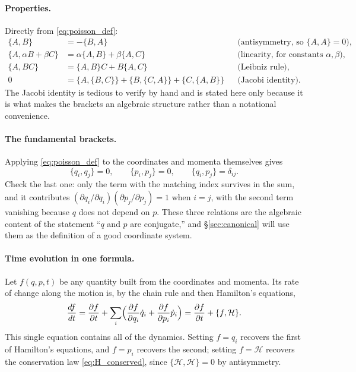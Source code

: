 \documentclass[12pt]{article}
\newcommand{\Ham}{\mathcal{H}}
\newcommand{\pb}[2]{\{#1,#2\}}
\begin{document}
\paragraph{Properties.}  Directly from \eqref{eq:poisson_def}:
%
\begin{align}
  \pb{A}{B} &= -\pb{B}{A}
    &&\text{(antisymmetry, so } \pb{A}{A} = 0),
  \label{eq:pb_antisym}\\
  \pb{A}{\alpha B + \beta C} &= \alpha\pb{A}{B} + \beta\pb{A}{C}
    &&\text{(linearity, for constants } \alpha,\beta),\\
  \pb{A}{BC} &= \pb{A}{B}C + B\pb{A}{C}
    &&\text{(Leibniz rule)},\\
  0 &= \pb{A}{\pb{B}{C}} + \pb{B}{\pb{C}{A}} + \pb{C}{\pb{A}{B}}
    &&\text{(Jacobi identity)} .
\end{align}
%
The Jacobi identity is tedious to verify by hand and is stated here
only because it is what makes the brackets an algebraic structure
rather than a notational convenience.

\paragraph{The fundamental brackets.}  Applying
\eqref{eq:poisson_def} to the coordinates and momenta themselves gives
%
\begin{equation}
  \pb{q_i}{q_j} = 0 ,
  \qquad
  \pb{p_i}{p_j} = 0 ,
  \qquad
  \pb{q_i}{p_j} = \delta_{ij} .
  \label{eq:fundamental_brackets}
\end{equation}
%
Check the last one: only the term with the matching index survives in
the sum, and it contributes
$(\partial q_i/\partial q_i)(\partial p_j/\partial p_j) = 1$ when
$i = j$, with the second term vanishing because $q$ does not depend on
$p$.  These three relations are the algebraic content of the statement
``$q$ and $p$ are conjugate,'' and \S\ref{sec:canonical} will use them
as the definition of a good coordinate system.

\paragraph{Time evolution in one formula.}  Let $f(q,p,t)$ be any
quantity built from the coordinates and momenta.  Its rate of change
along the motion is, by the chain rule and then Hamilton's equations,
%
\begin{equation}
  \frac{df}{dt}
   = \frac{\partial f}{\partial t}
   + \sum_i\Bigl(\frac{\partial f}{\partial q_i}\dot q_i
   + \frac{\partial f}{\partial p_i}\dot p_i\Bigr)
   = \frac{\partial f}{\partial t} + \pb{f}{\Ham} .
  \label{eq:evolution}
\end{equation}
%
This single equation contains all of the dynamics.  Setting $f = q_i$
recovers the first of Hamilton's equations, and $f = p_i$ recovers the
second; setting $f = \Ham$ recovers the conservation law
\eqref{eq:H_conserved}, since $\pb{\Ham}{\Ham} = 0$ by antisymmetry.
\end{document}

